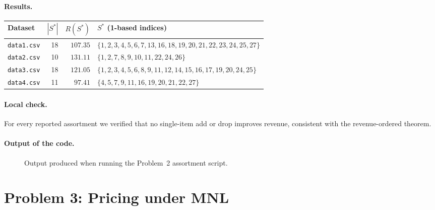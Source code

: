 \documentclass[11pt]{article}
\begin{document}
\paragraph{Results.}
\begin{center}
\begin{tabular}{lrrl}
\toprule
Dataset & $|S^*|$ & $R(S^*)$ & $S^*$ (1-based indices) \\
\midrule
\texttt{data1.csv} & 18 & $107.35$ & $\{1,2,3,4,5,6,7,13,16,18,19,20,21,22,23,24,25,27\}$ \\
\texttt{data2.csv} & 10 & $131.11$ & $\{1,2,7,8,9,10,11,22,24,26\}$ \\
\texttt{data3.csv} & 18 & $121.05$ & $\{1,2,3,4,5,6,8,9,11,12,14,15,16,17,19,20,24,25\}$ \\
\texttt{data4.csv} & 11 & $97.41$  & $\{4,5,7,9,11,16,19,20,21,22,27\}$ \\
\bottomrule
\end{tabular}
\end{center}

\paragraph{Local check.}
For every reported assortment we verified that no single-item add or drop
improves revenue, consistent with the revenue-ordered theorem.

\paragraph{Output of the code.}
\begin{figure}[h!]
  \centering
  \caption{Output produced when running the Problem~2 assortment script.}
\end{figure}

\FloatBarrier
\newpage

\section*{Problem 3: Pricing under MNL}
\label{sec:p3}
\end{document}
